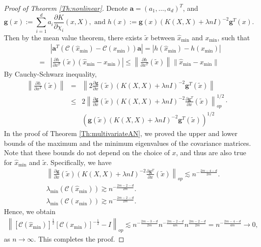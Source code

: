 \documentclass[12pt]{article}
\theoremstyle{plain}
\theoremstyle{remark}
\begin{document}
\begin{proof}[Proof of Theorem \ref{Th:nonlinear}]
 Denote $\mathbf{a}=(a_1,\ldots,a_d)^T$, and 
    \[\mathbf{g}(x):=\sum_{i=1}^d a_i\frac{\partial K}{\partial \chi_i}(x,X), \text{ and } h(x):=\mathbf{g}(x)(K(X,X)+\lambda n I)^{-2}\mathbf{g}^T(x).\]
    Then by the mean value theorem, there exists $\tilde{x}$ between $\hat{x}_{\min}$ and $x_{\min}$, such that
    \begin{eqnarray*}
        &&\left|\mathbf{a}^T\left(\mathscr{C}(\hat{x}_{\min})-\mathscr{C}(x_{\min})\right)\mathbf{a}\right|=|h(\hat{x}_{\min})-h(x_{\min})|\\
        &=&\left|\frac{\partial h}{\partial x^T}(\tilde{x})(\hat{x}_{\min}-x_{\min})\right|\leq \left\|\frac{\partial h}{\partial x^T}(\tilde{x})\right\|\|\hat{x}_{\min}-x_{\min}\|
    \end{eqnarray*}
    By Cauchy-Schwarz inequality,
    \begin{eqnarray*}
               \left\|\frac{\partial h}{\partial x^T}(\tilde{x})\right\| &=&\left\|2\frac{\partial \mathbf{g}}{\partial x}(\tilde{x})(K(X,X)+\lambda n I)^{-2}\mathbf{g}^T(\tilde{x})\right\|\\
        &\leq& 2\left\|\frac{\partial \mathbf{g}}{\partial x}(\tilde{x})(K(X,X)+\lambda n I)^{-2}\frac{\partial \mathbf{g}^T}{\partial x}(\tilde{x})\right\|_{op}^{1/2}\cdot\\
        &&\left(\mathbf{g}(\tilde{x})(K(X,X)+\lambda n I)^{-2}\mathbf{g}^T(\tilde{x})\right)^{1/2}
    \end{eqnarray*}
    In the proof of Theorem \ref{Th:multivariateAN}, we proved the upper and lower bounds of the maximum and the minimum eigenvalues of the covariance matrices. Note that these bounds do not depend on the choice of $x$, and thus are also true for $\hat{x}_{\min}$ and $\tilde{x}$. Specifically, we have
    \begin{eqnarray*}
       && \left\|\frac{\partial \mathbf{g}}{\partial x}(\tilde{x})(K(X,X)+\lambda n I)^{-2}\frac{\partial \mathbf{g}^T}{\partial x}(\tilde{x})\right\|_{op}\lesssim n^{-\frac{2m-4-d}{2m}}.\\
       && \lambda_{\min}(\mathscr{C}(\hat{x}_{\min}))\gtrsim n^{-\frac{2m-2-d}{2m}}.\\
       && \lambda_{\min}(\mathscr{C}(x_{\min}))\gtrsim n^{-\frac{2m-2-d}{2m}}.
    \end{eqnarray*}
    Hence, we obtain
    \begin{eqnarray*}
        \left\|[\mathscr{C}(\hat{x}_{\min})]^{\frac{1}{2}}[\mathscr{C}(x_{\min})]^{-\frac{1}{2}}-I\right\|_{op}\lesssim n^{-\frac{2m-3-d}{2m}} n^{-\frac{2m-2-d}{4m}}n^{\frac{2m-2-d}{2m}}=n^{-\frac{2m-4-d}{4m}}\rightarrow 0,
    \end{eqnarray*}
    as $n\rightarrow\infty$. This completes the proof.
\end{proof}
\end{document}
